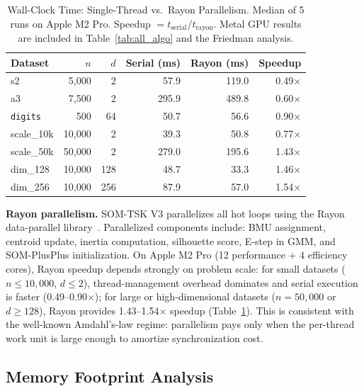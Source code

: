 \documentclass[journal]{IEEEtran}
\begin{document}
\begin{table}[!t]
\caption{Wall-Clock Time: Single-Thread vs.\ Rayon Parallelism.
Median of 5 runs on Apple M2 Pro. Speedup $= t_{\text{serial}} / t_{\text{rayon}}$.
Metal GPU results are included in Table~\ref{tab:all_algo} and the Friedman analysis.}
\label{tab:timing}
\centering
\renewcommand{\arraystretch}{1.1}
\small
\setlength{\tabcolsep}{4pt}
\begin{tabular}{lrrrrr}
\toprule
Dataset & $n$ & $d$ & Serial (ms) & Rayon (ms) & Speedup \\
\midrule
s2               & 5{,}000  & 2  & 57.9  & 119.0 & 0.49$\times$ \\
a3               & 7{,}500  & 2  & 295.9 & 489.8 & 0.60$\times$ \\
\texttt{digits}  &    500   & 64 & 50.7  & 56.6  & 0.90$\times$ \\
scale\_10k       & 10{,}000 & 2  & 39.3  & 50.8  & 0.77$\times$ \\
scale\_50k       & 50{,}000 & 2  & 279.0 & 195.6 & 1.43$\times$ \\
dim\_128         & 10{,}000 & 128& 48.7  & 33.3  & 1.46$\times$ \\
dim\_256         & 10{,}000 & 256& 87.9  & 57.0  & 1.54$\times$ \\
\bottomrule
\end{tabular}
\end{table}

\textbf{Rayon parallelism.}
SOM-TSK V3 parallelizes all hot loops using the Rayon data-parallel library~\cite{rayon2015}.
Parallelized components include: BMU assignment, centroid update, inertia computation,
silhouette score, E-step in GMM, and SOM-PlusPlus initialization.
On Apple M2 Pro (12 performance + 4 efficiency cores), Rayon speedup depends strongly on
problem scale: for small datasets ($n \leq 10{,}000$, $d \leq 2$), thread-management overhead
dominates and serial execution is faster (0.49--0.90$\times$); for large or
high-dimensional datasets ($n = 50{,}000$ or $d \geq 128$), Rayon provides
1.43--1.54$\times$ speedup (Table~\ref{tab:timing}).
This is consistent with the well-known Amdahl's-law regime: parallelism pays only when
the per-thread work unit is large enough to amortize synchronization cost.

\subsection{Memory Footprint Analysis}
\label{sec:memory}
\end{document}
